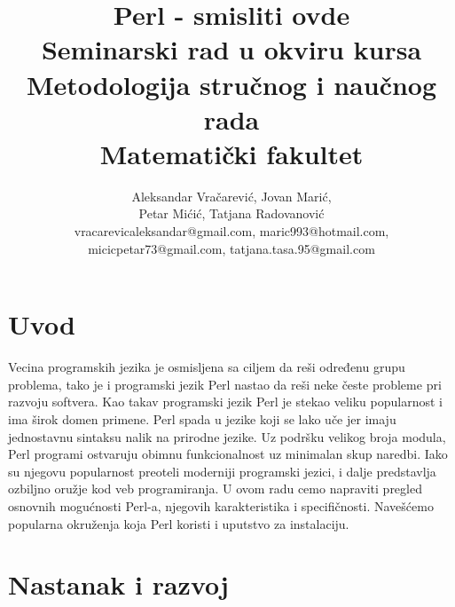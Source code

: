 \documentclass[a4paper]{article}
\begin{document}
\title{Perl - smisliti ovde\\ \small{Seminarski rad u okviru kursa\\Metodologija stručnog i naučnog rada\\ Matematički fakultet}}

\author{Aleksandar Vračarević, Jovan Marić,\\ Petar Mićić, Tatjana Radovanović\\ vracarevicaleksandar@gmail.com, maric993@hotmail.com,\\ micicpetar73@gmail.com, tatjana.tasa.95@gmail.com}


\maketitle

\setcounter{tocdepth}{1}
\tableofcontents

\newpage

\section{Uvod}
\label{sec:uvod}

Vecina programskih jezika je osmisljena sa ciljem da reši određenu grupu problema, tako je i programski jezik Perl nastao da reši neke česte probleme pri razvoju softvera. Kao takav programski jezik Perl je stekao veliku popularnost i ima širok domen primene. Perl spada u jezike koji se lako uče jer imaju jednostavnu sintaksu nalik na prirodne jezike. Uz podršku velikog broja modula, Perl programi ostvaruju obimnu funkcionalnost uz minimalan skup naredbi. Iako su njegovu popularnost
preoteli moderniji programski jezici, i dalje predstavlja ozbiljno oružje kod veb programiranja.
U ovom radu cemo napraviti pregled osnovnih mogućnosti Perl-a, njegovih karakteristika i specifičnosti. Navešćemo popularna okruženja koja Perl koristi i uputstvo za instalaciju.




\section{Nastanak i razvoj}
\end{document}
